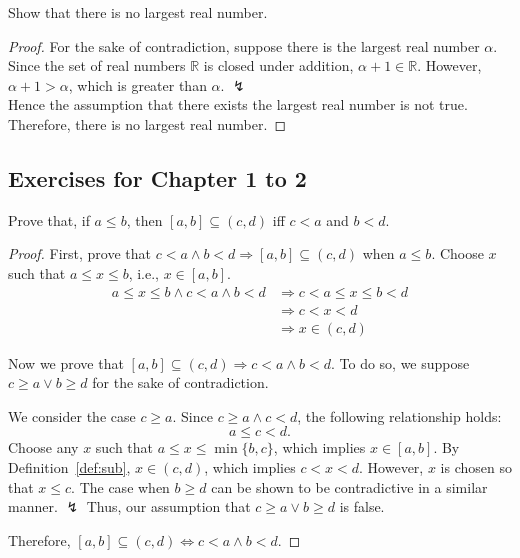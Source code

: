 \documentclass[../main.tex]{subfiles}
\begin{document}
\begin{ex}
    Show that there is no largest real number.
\end{ex}
\begin{proof}
    For the sake of contradiction, suppose there is the largest real number $\alpha$.
    Since the set of real numbers $\mathbb{R}$ is closed under addition, $\alpha + 1 \in \mathbb{R}$.
    However, $\alpha + 1 > \alpha$, which is greater than $\alpha$. $\lightning$\\
    Hence the assumption that there exists the largest real number is not true.
    Therefore, there is no largest real number.
\end{proof}

\subsection{Exercises for Chapter 1 to 2}
\begin{ex}
    Prove that, if $a \leq b$, then $[a, b] \subseteq (c, d)$ iff $c < a$ and $b < d$.
\end{ex}
\begin{proof}
    First, prove that $c < a \wedge b < d \Rightarrow [a, b] \subseteq (c, d)$ when $a \leq b$.
    Choose $x$ such that $a \leq x \leq b$, i.e., $x \in [a, b]$.
    \begin{align*}
        a \leq x \leq b \wedge c < a \wedge b < d &\Rightarrow c < a \leq x \leq b < d\\
                                                  &\Rightarrow c < x < d\\
                                                  &\Rightarrow x \in (c , d)
    \end{align*}

    Now we prove that $[a, b] \subseteq (c, d) \Rightarrow c < a \wedge b < d$.
    To do so, we suppose $c \geq a \vee b \geq d$ for the sake of contradiction.

    We consider the case $c \geq a$.
    Since $c \geq a \wedge c < d$, the following relationship holds:
    \[
        a \leq c < d.
    \]
    Choose any $x$ such that $a \leq x \leq \min \{ b, c\}$, which implies $x \in [a, b]$.
    By Definition~\ref{def:sub}, $x \in (c, d)$, which implies $c < x < d$.
    However, $x$ is chosen so that $x \leq c$.
    The case when $b \geq d$ can be shown to be contradictive in a similar manner. $\lightning$
    Thus, our assumption that $c \geq a \vee b \geq d$ is false.

    Therefore, $[a, b] \subseteq (c, d) \Leftrightarrow c < a \wedge b < d$.
\end{proof}
\end{document}
